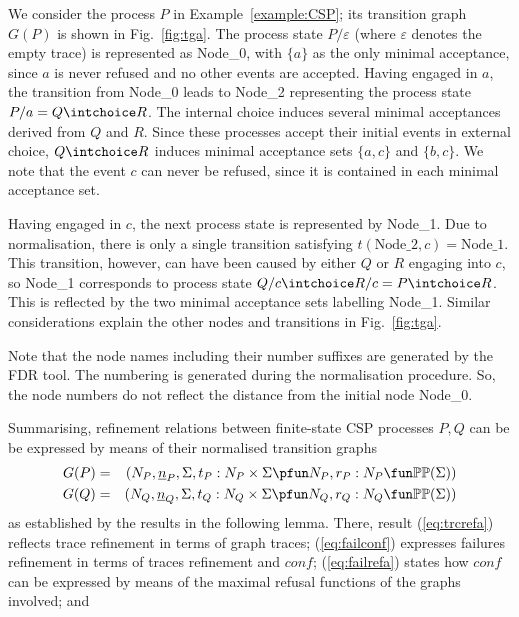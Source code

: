 \begin{example}\label{ex:a}
We consider the process $P$ in Example~\ref{example:CSP}; its transition
graph $G(P)$ is shown in Fig.~\ref{fig:tga}. The process state
$P/\varepsilon$ (where $\varepsilon$ denotes the empty trace) is represented
as Node\_0, with $\{ a\}$ as the only minimal acceptance, since $a$ is never
refused and no other events are accepted. Having engaged in $a$, the
transition from Node\_0 leads to Node\_2 representing the process state $P/a
= Q\intchoice R$. The internal choice induces several minimal acceptances
derived from $Q$ and $R$. Since these processes accept their initial events
in external choice, $Q\intchoice R$ induces minimal acceptance sets $\{a,c\}$
and $\{b,c\}$. We note that the event $c$ can never be refused, since it is
contained in each minimal acceptance set.

Having engaged in $c$, the next process state is represented by Node\_1. Due
to normalisation, there is only a single transition satisfying
$t(\text{Node\_2},c) = \text{Node\_1}$. This transition, however, can have
been caused by either $Q$ or $R$ engaging into $c$, so Node\_1 corresponds to
process state $Q/c \intchoice R/c = P \intchoice R$. This is reflected by the
two minimal acceptance sets labelling Node\_1. Similar considerations explain
the other nodes and transitions in Fig.~\ref{fig:tga}.

Note that the node names including their number suffixes are generated by the
FDR tool. The numbering is generated during the normalisation procedure. So,
the node numbers do not reflect the distance from the initial node Node\_0.
\xbox
\end{example}
%
Summarising, refinement relations between finite-state CSP processes $P, Q$ can be be
expressed by means of their normalised transition graphs
\begin{eqnarray*}
G(P) & = & ( N_P, {\ii n}_P, \Sigma, t_P : N_P\times\Sigma \pfun N_P, r_P : N_P \fun \mathbb{P}\mathbb{P}(\Sigma))
\\
G(Q) & = & ( N_Q, {\ii n}_Q, \Sigma, t_Q : N_Q\times\Sigma \pfun N_Q, r_Q : N_Q \fun \mathbb{P}\mathbb{P}(\Sigma))
\end{eqnarray*}
%
as established by the results  in the following lemma.
There, result (\ref{eq:trcrefa}) reflects trace refinement in terms of graph
traces; (\ref{eq:failconf}) expresses failures refinement in terms of traces
refinement and $conf$; (\ref{eq:failrefa}) states how $conf$ can be expressed
by means of the maximal refusal functions of the graphs involved; and
